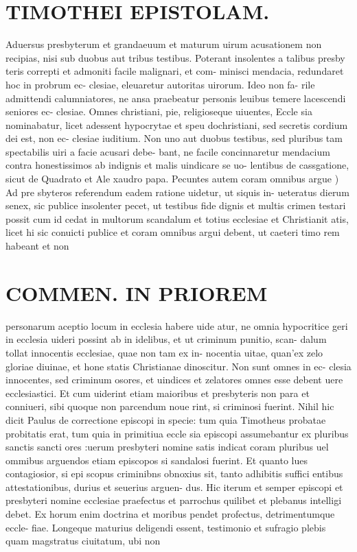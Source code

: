 \documentclass{article}
\begin{document}
\begin{pages}
\section*{TIMOTHEI EPISTOLAM. }
\marginpar{[ p.143 ]}\pstart Aduersus presbyterum et grandaeuum et maturum uirum acusationem non recipias, nisi sub duobus aut tribus testibus. Poterant insolentes a talibus presby teris correpti et admoniti facile malignari, et com- minisci mendacia, redundaret hoc in probrum ec- clesiae, eleuaretur autoritas uirorum. Ideo non fa- rile admittendi calumniatores, ne ansa praebeatur personis leuibus temere lacescendi seniores ec- clesiae.  \pend\pstart Omnes christiani, pie, religioseque uiuentes, Eccle sia nominabatur, licet adessent hypocrytae et speu dochristiani, sed secretis cordium dei est, non ec- clesiae iuditium. Non uno aut duobus testibus, sed pluribus tam spectabilis uiri a facie acusari debe- bant, ne facile concinnaretur mendacium contra honestissimos ab indignis et malis uindicare se uo- lentibus de cassgatione, sicut de Quadrato et Ale xaudro papa.  \pend\pstart Pecuntes autem coram omnibus argue ) Ad pre sbyteros referendum eadem ratione uidetur, ut siquis in- ueteratus dierum senex, sic publice insolenter pecet, ut testibus fide dignis et multis crimen testari possit cum id cedat in multorum scandalum et totius ecclesiae et Christianit atis, licet hi sic conuicti publice et coram omnibus argui debent, ut caeteri timo rem habeant et non  \pend
\section*{COMMEN. IN PRIOREM }
\marginpar{[ p.144 ]}\pstart personarum aceptio locum in ecclesia habere uide atur, ne omnia hypocritice geri in ecclesia uideri possint ab in idelibus, et ut criminum punitio, scan- dalum tollat innocentis ecclesiae, quae non tam ex in- nocentia uitae, quan'ex zelo gloriae diuinae, et hone statis Christianae dinoscitur. Non sunt omnes in ec- clesia innocentes, sed criminum osores, et uindices et zelatores omnes esse debent uere ecclesiastici. Et cum uiderint etiam maioribus et presbyteris non para et conniueri, sibi quoque non parcendum noue rint, si criminosi fuerint. Nihil hic dicit Paulus de correctione episcopi in specie: tum quia Timotheus probatae probitatis erat, tum quia in primitiua eccle sia episcopi assumebantur ex pluribus sanctis sancti ores :uerum presbyteri nomine satis indicat coram pluribus uel ommibus arguendos etiam episcopos si sandalosi fuerint. Et quanto lues contagiosior, si epi scopus criminibns obnoxius sit, tanto adhibitis suffici entibus attestationibus, durius et seuerius arguen- dus. Hic iterum et semper episcopi et presbyteri nomine ecclesiae praefectus et parrochus quilibet et plebanus intelligi debet. Ex horum enim doctrina et moribus pendet profectus, detrimentumque eccle- fiae. Longeque maturius deligendi essent, testimonio et sufragio plebis quam magstratus ciuitatum, ubi non  \pend

\end{pages}
\end{document}

